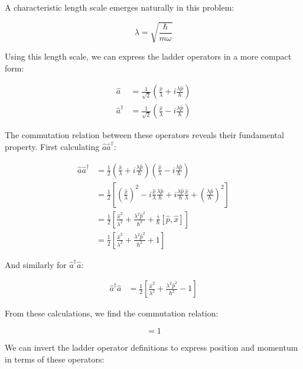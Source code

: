 A characteristic length scale emerges naturally in this problem:

\begin{equation}
\lambda = \sqrt{\frac{\hbar}{m\omega}}
\end{equation}

Using this length scale, we can express the ladder operators in a more compact form:

\begin{align}
\hat{a} &= \frac{1}{\sqrt{2}}\left(\frac{\hat{x}}{\lambda} + i\frac{\lambda\hat{p}}{\hbar}\right)  \\
\hat{a}^\dagger &= \frac{1}{\sqrt{2}}\left(\frac{\hat{x}}{\lambda} - i\frac{\lambda\hat{p}}{\hbar}\right)
\end{align}

The commutation relation between these operators reveals their fundamental property. First calculating $\hat{a}\hat{a}^\dagger$:

\begin{align}
\hat{a}\hat{a}^\dagger &= \frac{1}{2}\left(\frac{\hat{x}}{\lambda} + i\frac{\lambda\hat{p}}{\hbar}\right)\left(\frac{\hat{x}}{\lambda} - i\frac{\lambda\hat{p}}{\hbar}\right) \\
&= \frac{1}{2}\left[\left(\frac{\hat{x}}{\lambda}\right)^2 - i\frac{\hat{x}}{\lambda}\frac{\lambda\hat{p}}{\hbar} + i\frac{\lambda\hat{p}}{\hbar}\frac{\hat{x}}{\lambda} + \left(\frac{\lambda\hat{p}}{\hbar}\right)^2\right] \\
&= \frac{1}{2}\left[\frac{\hat{x}^2}{\lambda^2} + \frac{\lambda^2\hat{p}^2}{\hbar^2} + \frac{i}{\hbar}[\hat{p},\hat{x}]\right]  \\
&= \frac{1}{2}\left[\frac{\hat{x}^2}{\lambda^2} + \frac{\lambda^2\hat{p}^2}{\hbar^2} + 1\right]
\end{align}

And similarly for $\hat{a}^\dagger\hat{a}$:

\begin{align}
\hat{a}^\dagger\hat{a} &= \frac{1}{2}\left[\frac{\hat{x}^2}{\lambda^2} + \frac{\lambda^2\hat{p}^2}{\hbar^2} - 1\right]
\end{align}

From these calculations, we find the commutation relation:

\begin{equation}
[a,a^\dagger] = 1
\end{equation}

We can invert the ladder operator definitions to express position and momentum in terms of these operators:

